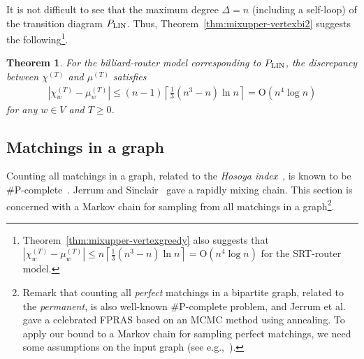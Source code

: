 \documentclass[letter, 11pt]{article}
\newcommand{\Order}{\mathrm{O}}
\newcommand{\1}{\mbox{1}\hspace{-0.25em}\mbox{l}}
\newtheorem{theorem}{Theorem}[section]
\begin{document}
 It is not difficult to see that the maximum degree $\Delta = n$ (including a self-loop) 
   of the transition diagram $P_{\rm LIN}$. 
 Thus, Theorem~\ref{thm:mixupper-vertexbi2} suggests the following\footnote{
   Theorem~\ref{thm:mixupper-vertexgreedy} also suggests that 
$|\chi_w^{(T)}-\mu_w^{(T)} | \leq n\left\lceil \frac{1}{3}(n^3-n)\ln n \right\rceil = \Order(n^4 \log n)$ 
for the SRT-router model. 
  }. 
\begin{theorem}\label{thm:linearupper-SRT}
For the billiard-router model corresponding to $P_{\rm LIN}$, 
 the discrepancy between $\chi^{(T)}$ and $\mu^{(T)}$ satisfies
\begin{eqnarray*}
\left|\chi_w^{(T)}-\mu_w^{(T)}\right| \leq (n-1)\left\lceil \frac{1}{3}(n^3-n)\ln n \right\rceil = \Order(n^4 \log n)
\end{eqnarray*}
for any $w\in V$ and $T\geq 0$. 
\end{theorem}

\subsection{Matchings in a graph}\label{sec:matching}Counting all matchings in a graph, 
   related to the {\em Hosoya index}~\cite{Hosoya71}, 
  is known to be {\#}P-complete~\cite{Valiant79b}. 
 Jerrum and Sinclair~\cite{JS96} gave a rapidly mixing chain. 
 This section is concerned with a Markov chain for sampling from all matchings in a graph\footnote{ 
Remark that 
  counting all {\em perfect} matchings in a bipartite graph, 
   related to the {\em permanent}, 
  is also well-known {\#}P-complete problem, 
  and  
   Jerrum et al.~\cite{JSV04} gave a celebrated FPRAS 
   based on an MCMC method using annealing.
 To apply our bound to a Markov chain for sampling perfect matchings, 
  we need some assumptions on the input graph (see e.g.,~\cite{Sinclair93,JS96,JSV04}). 
}. 
\end{document}
